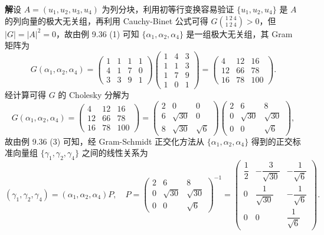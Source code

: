 \documentclass[UTF8, 12pt, fontset=fandol, oneside]{ctexart}
\begin{document}
\noindent\textbf{解}\quad 设 $A=(u_1,u_2,u_3,u_4)$ 为列分块，利用初等行变换容易验证 $\{u_1,u_2,u_4\}$ 是 $A$ 的列向量的极大无关组，再利用 Cauchy-Binet 公式可得 $G\binom{1\ 2\ 4}{1\ 2\ 4}>0$，但 $|G|=|A|^2=0$，故由例 9.36 (1) 可知 $\{\alpha_1,\alpha_2,\alpha_4\}$ 是一组极大无关组，其 Gram 矩阵为
\[
G(\alpha_1,\alpha_2,\alpha_4)=
\begin{pmatrix}
1&1&1&1\\
4&1&7&0\\
3&3&9&1
\end{pmatrix}
\begin{pmatrix}
1&4&3\\
1&1&3\\
1&7&9\\
1&0&1
\end{pmatrix}
=
\begin{pmatrix}
4&12&16\\
12&66&78\\
16&78&100
\end{pmatrix}.
\]
经计算可得 $G$ 的 Cholesky 分解为
\[
G(\alpha_1,\alpha_2,\alpha_4)=
\begin{pmatrix}
4&12&16\\
12&66&78\\
16&78&100
\end{pmatrix}
=
\begin{pmatrix}
2&0&0\\
6&\sqrt{30}&0\\
8&\sqrt{30}&\sqrt6
\end{pmatrix}
\begin{pmatrix}
2&6&8\\
0&\sqrt{30}&\sqrt{30}\\
0&0&\sqrt6
\end{pmatrix},
\]
故由例 9.36 (3) 可知，经 Gram-Schmidt 正交化方法从 $\{\alpha_1,\alpha_2,\alpha_4\}$ 得到的正交标准向量组 $\{\gamma_1,\gamma_2,\gamma_4\}$ 之间的线性关系为
\[
(\gamma_1,\gamma_2,\gamma_4)=(\alpha_1,\alpha_2,\alpha_4)P,\quad
P=
\begin{pmatrix}
2&6&8\\
0&\sqrt{30}&\sqrt{30}\\
0&0&\sqrt6
\end{pmatrix}^{-1}
=
\begin{pmatrix}
\dfrac12&-\dfrac3{\sqrt{30}}&-\dfrac1{\sqrt6}\\
0&\dfrac1{\sqrt{30}}&-\dfrac1{\sqrt6}\\
0&0&\dfrac1{\sqrt6}
\end{pmatrix}.
\]
\end{document}
